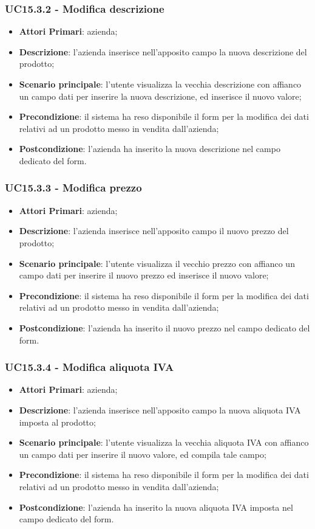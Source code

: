 \subsubsection{UC15.3.2 - Modifica descrizione}
\begin{itemize}
	\item \textbf{Attori Primari}: azienda;
	\item \textbf{Descrizione}: l'azienda inserisce nell'apposito campo la nuova descrizione del prodotto;
	\item \textbf{Scenario principale}: l'utente visualizza la vecchia descrizione con affianco un campo dati per inserire la nuova descrizione, ed inserisce il nuovo valore;
	\item \textbf{Precondizione}: il sistema ha reso disponibile il form per la modifica dei dati relativi ad un prodotto messo in vendita dall'azienda;
	\item \textbf{Postcondizione}: l'azienda ha inserito la nuova descrizione nel campo dedicato del form.
\end{itemize}

\subsubsection{UC15.3.3 - Modifica prezzo}
\begin{itemize}
	\item \textbf{Attori Primari}: azienda;
	\item \textbf{Descrizione}: l'azienda inserisce nell'apposito campo il nuovo prezzo del prodotto;
	\item \textbf{Scenario principale}: l'utente visualizza il vecchio prezzo con affianco un campo dati per inserire il nuovo prezzo ed inserisce il nuovo valore;
	\item \textbf{Precondizione}: il sistema ha reso disponibile il form per la modifica dei dati relativi ad un prodotto messo in vendita dall'azienda;
	\item \textbf{Postcondizione}: l'azienda ha inserito il nuovo prezzo nel campo dedicato del form.
\end{itemize}

\subsubsection{UC15.3.4 - Modifica aliquota IVA}
\begin{itemize}
	\item \textbf{Attori Primari}: azienda;
	\item \textbf{Descrizione}: l'azienda inserisce nell'apposito campo la 
	nuova aliquota IVA imposta al prodotto;
	\item \textbf{Scenario principale}: l'utente visualizza la vecchia aliquota IVA con affianco un campo dati per inserire il nuovo valore, ed compila 
	tale campo;
	\item \textbf{Precondizione}: il sistema ha reso disponibile il form per la modifica dei dati relativi ad un prodotto messo in vendita dall'azienda;
	\item \textbf{Postcondizione}: l'azienda ha inserito la nuova aliquota IVA imposta nel campo dedicato del form.
\end{itemize}

